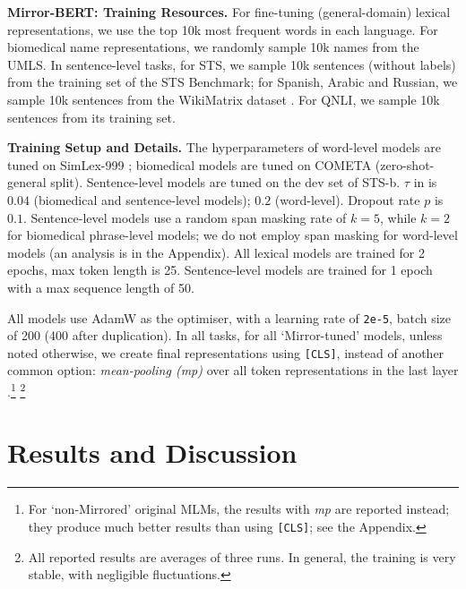 \documentclass[11pt]{article}
\begin{document}
\vspace{1.5mm}
\noindent \textbf{Mirror-BERT: Training Resources.} For fine-tuning (general-domain) lexical representations, we use the top 10k most frequent words in each language. For biomedical name representations, we randomly sample 10k names from the UMLS. In sentence-level tasks, for STS, we sample 10k sentences (without labels) from the training set of the STS Benchmark; for Spanish, Arabic and Russian, we sample 10k sentences from the WikiMatrix dataset \citep{schwenk2019wikimatrix}. For QNLI, we sample 10k sentences from its training set. 





\vspace{1.5mm}
\noindent \textbf{Training Setup and Details.} 
The hyperparameters of word-level models are tuned on SimLex-999 \citep{hill2015simlex}; biomedical models are tuned on COMETA (zero-shot-general split). Sentence-level models are tuned on the dev set of STS-b. $\tau$ in  is $0.04$ (biomedical and sentence-level models); $0.2$ (word-level). Dropout rate $p$ is $0.1$. Sentence-level models use a random span masking rate of $k=5$, while $k=2$ for biomedical phrase-level models; we do not employ span masking for word-level models (an analysis is in the Appendix). All lexical models are trained for 2 epochs, max token length is 25. Sentence-level models are trained for 1 epoch with a max sequence length of 50. 

All models use AdamW \citep{loshchilov2018decoupled} as the optimiser, with a learning rate of \texttt{2e-5}, batch size of 200 (400 after duplication). In all tasks, for all `Mirror-tuned' models, unless noted otherwise, we create final representations using \texttt{[CLS]}, instead of another common option: \textit{mean-pooling (mp)} over all token representations in the last layer \cite{reimers2019sentence}.\footnote{For `non-Mirrored' original MLMs, the results with \textit{mp} are reported instead; they produce much better results than using \texttt{[CLS]}; see the Appendix.} \footnote{All reported results are averages of three runs. In general, the training is very stable, with negligible fluctuations.}





\section{Results and Discussion}
\label{s:results}
\end{document}
